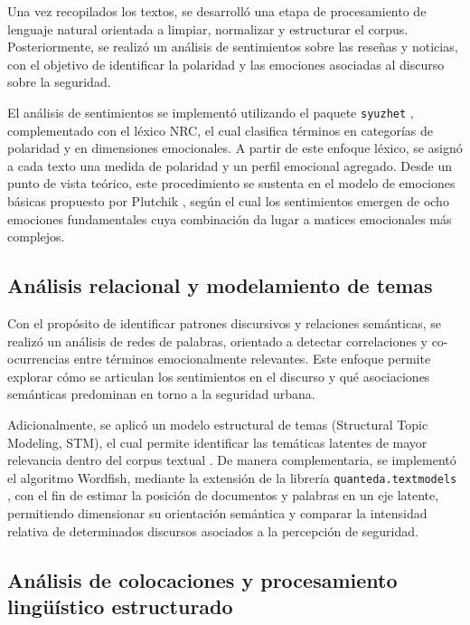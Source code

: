 \documentclass[sn-basic,pdflatex]{sn-jnl}
\theoremstyle{remark}
\theoremstyle{definition}
\begin{document}
Una vez recopilados los textos, se desarrolló una etapa de procesamiento
de lenguaje natural orientada a limpiar, normalizar y estructurar el
corpus. Posteriormente, se realizó un análisis de sentimientos sobre las
reseñas y noticias, con el objetivo de identificar la polaridad y las
emociones asociadas al discurso sobre la seguridad.

El análisis de sentimientos se implementó utilizando el paquete
\texttt{syuzhet} \citep{jockers2015}, complementado con el léxico NRC,
el cual clasifica términos en categorías de polaridad y en dimensiones
emocionales. A partir de este enfoque léxico, se asignó a cada texto una
medida de polaridad y un perfil emocional agregado. Desde un punto de
vista teórico, este procedimiento se sustenta en el modelo de emociones
básicas propuesto por Plutchik \citep{plutchik2003}, según el cual los
sentimientos emergen de ocho emociones fundamentales cuya combinación da
lugar a matices emocionales más complejos.

\subsection{Análisis relacional y modelamiento de
temas}\label{anuxe1lisis-relacional-y-modelamiento-de-temas}

Con el propósito de identificar patrones discursivos y relaciones
semánticas, se realizó un análisis de redes de palabras, orientado a
detectar correlaciones y co-ocurrencias entre términos emocionalmente
relevantes. Este enfoque permite explorar cómo se articulan los
sentimientos en el discurso y qué asociaciones semánticas predominan en
torno a la seguridad urbana.

Adicionalmente, se aplicó un modelo estructural de temas (Structural
Topic Modeling, STM), el cual permite identificar las temáticas latentes
de mayor relevancia dentro del corpus textual \citep{roberts2019}. De
manera complementaria, se implementó el algoritmo Wordfish, mediante la
extensión de la librería \texttt{quanteda.textmodels}
\citep{benoit2024textmodels}, con el fin de estimar la posición de
documentos y palabras en un eje latente, permitiendo dimensionar su
orientación semántica y comparar la intensidad relativa de determinados
discursos asociados a la percepción de seguridad.

\subsection{Análisis de colocaciones y procesamiento lingüístico
estructurado}\label{anuxe1lisis-de-colocaciones-y-procesamiento-linguxfcuxedstico-estructurado}
\end{document}
